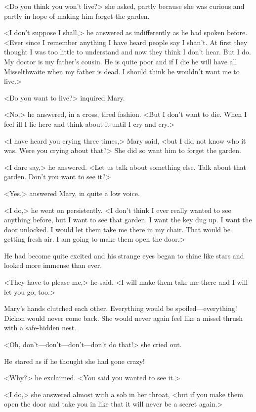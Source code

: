<Do you think you won't live?> she asked, partly because she was curious and partly in hope of making him forget the garden.

<I don't suppose I shall,> he answered as indifferently as he had spoken before. <Ever since I remember anything I have heard people say I shan't. At first they thought I was too little to understand and now they think I don't hear. But I do. My doctor is my father's cousin. He is quite poor and if I die he will have all Misselthwaite when my father is dead. I should think he wouldn't want me to live.>

<Do you want to live?> inquired Mary.

<No,> he answered, in a cross, tired fashion. <But I don't want to die. When I feel ill I lie here and think about it until I cry and cry.>

<I have heard you crying three times,> Mary said, <but I did not know who it was. Were you crying about that?> She did so want him to forget the garden.

<I dare say,> he answered. <Let us talk about something else. Talk about that garden. Don't you want to see it?>

<Yes,> answered Mary, in quite a low voice.

<I do,> he went on persistently. <I don't think I ever really wanted to see anything before, but I want to see that garden. I want the key dug up. I want the door unlocked. I would let them take me there in my chair. That would be getting fresh air. I am going to make them open the door.>

He had become quite excited and his strange eyes began to shine like stars and looked more immense than ever.

<They have to please me,> he said. <I will make them take me there and I will let you go, too.>

Mary's hands clutched each other. Everything would be spoiled—everything! Dickon would never come back. She would never again feel like a missel thrush with a safe-hidden nest.

<Oh, don't—don't—don't—don't do that!> she cried out.

He stared as if he thought she had gone crazy!

<Why?> he exclaimed. <You said you wanted to see it.>

<I do,> she answered almost with a sob in her throat, <but if you make them open the door and take you in like that it will never be a secret again.>

